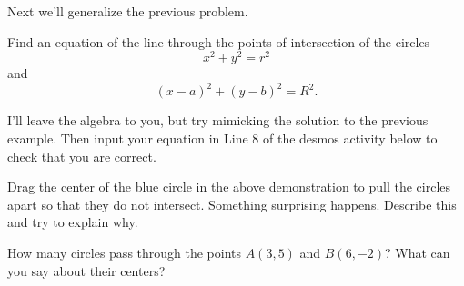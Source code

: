 \documentclass{ximera}
\begin{document}
Next we'll generalize the previous problem.

\begin{example} \label{Ex4c}
Find an equation of the line through the points of intersection of the circles
\[
    x^2 + y^2 = r^2
\]
and 
\[
   (x-a)^2 + (y-b)^2=R^2.
\]
\end{example}

\begin{explanation}
I'll leave the algebra to you, but try mimicking the solution to the previous example. Then input your equation in Line 8 of the desmos activity below to check that you are correct.

\begin{onlineOnly}
    \begin{center}
\end{center}
\end{onlineOnly}

\begin{question}
Drag the center of the blue circle in the above demonstration to pull the circles apart so that they do not intersect. Something surprising happens. Describe this and try to explain why.
\end{question}

\end{explanation}



\begin{example}  \label{Ex5}
How many circles pass through the points $A(3,5)$ and $B(6,-2)$? What can you say about their centers?
\end{example}
\end{document}
